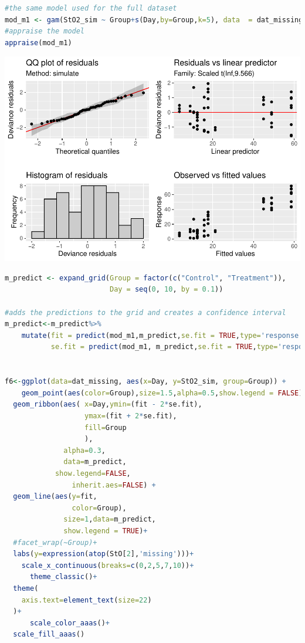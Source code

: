\documentclass[
]{article}
\begin{document}
\begin{lstlisting}[language=R]
#the same model used for the full dataset
mod_m1 <- gam(StO2_sim ~ Group+s(Day,by=Group,k=5), data  = dat_missing,family=scat)
#appraise the model
appraise(mod_m1)
\end{lstlisting}

\includegraphics{Full_document_files/figure-latex/missing-data-Appendix-1}

\begin{lstlisting}[language=R]
m_predict <- expand_grid(Group = factor(c("Control", "Treatment")),
                         Day = seq(0, 10, by = 0.1))

#adds the predictions to the grid and creates a confidence interval
m_predict<-m_predict%>%
    mutate(fit = predict(mod_m1,m_predict,se.fit = TRUE,type='response')$fit,
           se.fit = predict(mod_m1, m_predict,se.fit = TRUE,type='response')$se.fit)


f6<-ggplot(data=dat_missing, aes(x=Day, y=StO2_sim, group=Group)) +
    geom_point(aes(color=Group),size=1.5,alpha=0.5,show.legend = FALSE)+
  geom_ribbon(aes( x=Day,ymin=(fit - 2*se.fit), 
                   ymax=(fit + 2*se.fit),
                   fill=Group
                   ),
              alpha=0.3,
              data=m_predict,
            show.legend=FALSE,
                inherit.aes=FALSE) +
  geom_line(aes(y=fit,
                color=Group),
              size=1,data=m_predict,
              show.legend = TRUE)+
  #facet_wrap(~Group)+
  labs(y=expression(atop(StO[2],'missing')))+
    scale_x_continuous(breaks=c(0,2,5,7,10))+
      theme_classic()+
  theme(
    axis.text=element_text(size=22)
  )+
      scale_color_aaas()+
  scale_fill_aaas()
\end{lstlisting}
\end{document}
